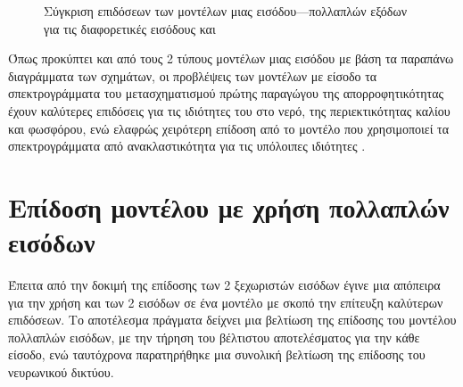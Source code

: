 \begin{figure}[H]
    \caption{Σύγκριση επιδόσεων των μοντέλων μιας εισόδου---πολλαπλών εξόδων  για τις διαφορετικές εισόδους  και }
\end{figure}

Όπως προκύπτει και από τους 2 τύπους μοντέλων μιας εισόδου με βάση τα παραπάνω διαγράμματα των σχημάτων, οι προβλέψεις των μοντέλων με είσοδο τα σπεκτρογράμματα του μετασχηματισμού  πρώτης παραγώγου της απορροφητικότητας έχουν καλύτερες επιδόσεις για τις ιδιότητες του  στο νερό, της περιεκτικότητας καλίου και φωσφόρου, ενώ ελαφρώς χειρότερη επίδοση από το μοντέλο που χρησιμοποιεί τα σπεκτρογράμματα από ανακλαστικότητα για τις υπόλοιπες ιδιότητες .

\section{Επίδοση μοντέλου με χρήση πολλαπλών εισόδων}
Έπειτα από την δοκιμή της επίδοσης των 2 ξεχωριστών εισόδων έγινε μια απόπειρα για την χρήση και των 2 εισόδων σε ένα μοντέλο με σκοπό την επίτευξη καλύτερων επιδόσεων. Το αποτέλεσμα πράγματα δείχνει μια βελτίωση της επίδοσης του μοντέλου πολλαπλών εισόδων, με την τήρηση του βέλτιστου αποτελέσματος για την κάθε είσοδο, ενώ ταυτόχρονα παρατηρήθηκε μια συνολική βελτίωση της επίδοσης του νευρωνικού δικτύου.

